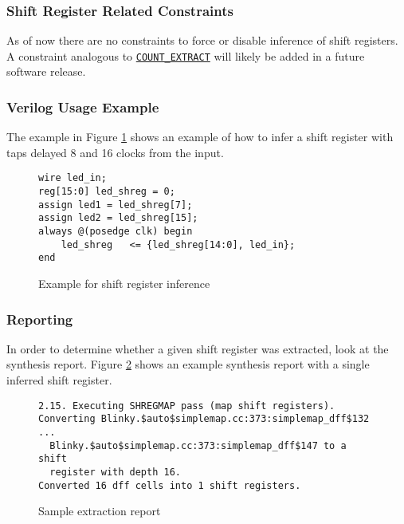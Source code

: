 \documentclass[11pt]{article}
\newcommand{\tokenstyle}[1]{\texttt{#1}}
\newcommand{\tokenref}[2]{\hyperref[#2]{\tokenstyle{#1}}}
\begin{document}
\subsubsection{Shift Register Related Constraints}

As of now there are no constraints to force or disable inference of shift registers. A constraint analogous to
\tokenref{COUNT\_EXTRACT}{count-extract} will likely be added in a future software release.

\subsubsection{Verilog Usage Example}

The example in Figure \ref{gp-shreginfer-example} shows an example of how to infer a shift register with taps delayed 8
and 16 clocks from the input.

\begin{figure}[h]
\begin{lstlisting}
wire led_in;
reg[15:0] led_shreg = 0;
assign led1 = led_shreg[7];
assign led2 = led_shreg[15];
always @(posedge clk) begin
	led_shreg	<= {led_shreg[14:0], led_in};
end
\end{lstlisting}
\caption{Example for shift register inference}
\label{gp-shreginfer-example}
\end{figure}

\subsubsection{Reporting}

In order to determine whether a given shift register was extracted, look at the synthesis report. Figure
\ref{shreg-extraction} shows an example synthesis report with a single inferred shift register.

\begin{figure}[h]
{\small
\begin{verbatim}
2.15. Executing SHREGMAP pass (map shift registers).
Converting Blinky.$auto$simplemap.cc:373:simplemap_dff$132 ...
  Blinky.$auto$simplemap.cc:373:simplemap_dff$147 to a shift
  register with depth 16.
Converted 16 dff cells into 1 shift registers.
\end{verbatim}
}
\caption{Sample extraction report}
\label{shreg-extraction}
\end{figure}

\end{document}
